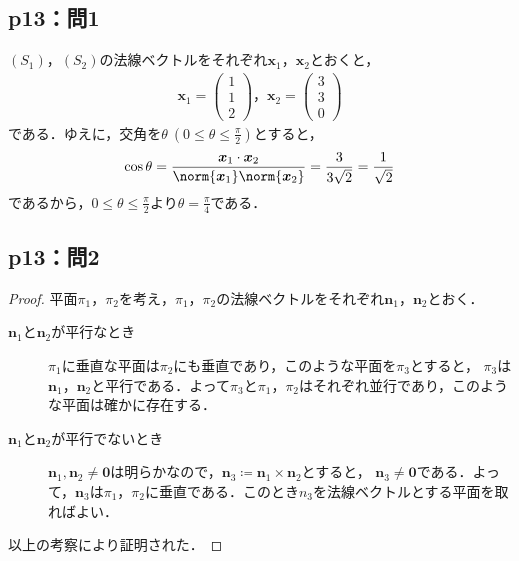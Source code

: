 \documentclass[uplatex,dvipdfmx,a4paper,10pt,fleqn]{jsarticle}
\begin{document}
\subsection*{p13：問1}
%
\begin{tleftbar}
    $(S_1)$，$(S_2)$の法線ベクトルをそれぞれ$\bm{x}_1$，$\bm{x}_2$とおくと，
    \begin{gather*}
        \bm{x}_1 =
            \begin{pmatrix}
                1\\
                1\\
                2
            \end{pmatrix}
        ，
        \bm{x}_2 =
            \begin{pmatrix}
                3\\
                3\\
                0
            \end{pmatrix}
        \end{gather*}
        である．ゆえに，交角を$\theta ~(0 \le \theta \le \frac{\pi}{2})$とすると，
        \[
            \cos \theta = \frac{\bm{x}_1 \cdot \bm{x}_2}{\norm{\bm{x}_1} \norm{\bm{x}_2}}=\frac{3}{3\sqrt{2}}=\frac{1}{\sqrt{2}}
        \]
        であるから，$0 \le \theta \le \frac{\pi}{2}$より$\theta =\frac{\pi}{4}$である．
    \end{tleftbar}
%
\subsection*{p13：問2}

\begin{tleftbar}
    \begin{proof}
    平面$\pi_1$，$\pi_2$を考え，$\pi_1$，$\pi_2$の法線ベクトルをそれぞれ$\bm{n}_1$，$\bm{n}_2$とおく．
    \begin{description}
        \item[$\bm{n}_1$と$\bm{n}_2$が平行なとき]
        $\pi_1$に垂直な平面は$\pi_2$にも垂直であり，このような平面を$\pi_3$とすると，
        $\pi_3$は$\bm{n}_1$，$\bm{n}_2$と平行である．よって$\pi_3$と$\pi_1$，$\pi_2$はそれぞれ並行であり，このような平面は確かに存在する．
        \item[$\bm{n}_1$と$\bm{n}_2$が平行でないとき]
        $\bm{n}_1 , \bm{n}_2 \ne \bm{0}$は明らかなので，$\bm{n}_3 \coloneqq \bm{n}_1 \times \bm{n}_2$とすると，
        $\bm{n}_3 \ne \bm{0}$である．よって，$\bm{n}_3$は$\pi_1$，$\pi_2$に垂直である．このとき$n_3$を法線ベクトルとする平面を取ればよい．
    \end{description}
    以上の考察により証明された．
\end{proof}
\end{tleftbar}
\newpage
%
%
%
\end{document}
